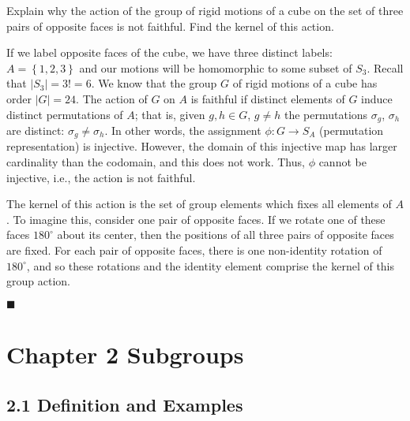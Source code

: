 \documentclass[12pt]{article}
\renewcommand{\qed}{\hfill$\blacksquare$}
\renewenvironment{proof}{\begin{addmargin}[1em]{0em}\begin{newproof}}{\end{newproof}\end{addmargin}\qed}
\newenvironment{problem}[2][Exercise]{\begin{trivlist}
\item[\hskip \labelsep {\bfseries #1}\hskip \labelsep {\bfseries #2.}]}{\end{trivlist}}
\begin{document}
\begin{problem}{1.7.23}
Explain why the action of the group of rigid motions of a cube on the set of three pairs of opposite faces is not faithful. Find the kernel of this action.
\end{problem}
\begin{proof}
If we label opposite faces of the cube, we have three distinct labels: $A=\left\{1,2,3\right\}$ and our motions will be homomorphic to some subset of $S_3$. Recall that $\left|S_3\right|=3!=6$. We know that the group $G$ of rigid motions of a cube has order $\left|G\right|=24$. The action of $G$ on $A$ is faithful if distinct elements of $G$ induce distinct permutations of $A$; that is, given $g,h\in G$, $g\neq h$ the permutations $\sigma_g$, $\sigma_h$ are distinct: $\sigma_g\neq \sigma_h$. In other words, the assignment $\phi:G\rightarrow S_A$ (permutation representation) is injective. However, the domain of this injective map has larger cardinality than the codomain, and this does not work. Thus, $\phi$ cannot be injective, i.e., the action is not faithful.

The kernel of this action is the set of group elements which fixes all elements of $A$. To imagine this, consider one pair of opposite faces. If we rotate one of these faces $180^{\circ}$ about its center, then the positions of all three pairs of opposite faces are fixed. For each pair of opposite faces, there is one non-identity rotation of $180^{\circ}$, and so these rotations and the identity element comprise the kernel of this group action.
\end{proof}















\newpage
\section*{Chapter 2 Subgroups}

\subsection*{2.1 Definition and Examples}
\end{document}
